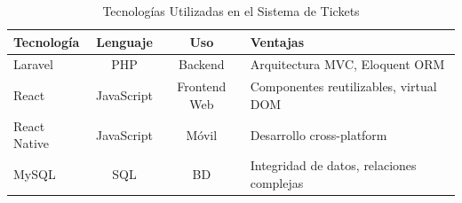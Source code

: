 \begin{table}[htbp]
\centering
\caption{Tecnologías Utilizadas en el Sistema de Tickets}
\label{tab:frameworks}
\footnotesize
\begin{tabular}{lccp{4cm}}
\toprule
\textbf{Tecnología} & \textbf{Lenguaje} & \textbf{Uso} & \textbf{Ventajas} \\
\midrule
Laravel & PHP & Backend & Arquitectura MVC, Eloquent ORM \\
React & JavaScript & Frontend Web & Componentes reutilizables, virtual DOM \\
React Native & JavaScript & Móvil & Desarrollo cross-platform \\
MySQL & SQL & BD & Integridad de datos, relaciones complejas \\
\bottomrule
\end{tabular}
\end{table}